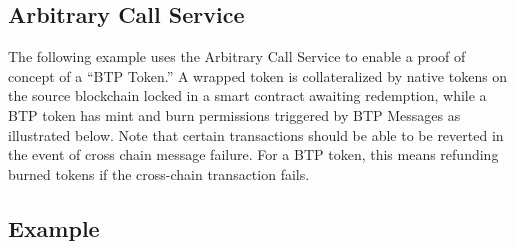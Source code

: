 \documentclass{article}
\begin{document}
\subsection{Arbitrary Call Service}
The following example uses the Arbitrary Call Service to enable a proof of concept of a “BTP Token.” A wrapped token is collateralized by native tokens on the source blockchain locked in a smart contract awaiting redemption, while a BTP token has mint and burn permissions triggered by BTP Messages as illustrated below. Note that certain transactions should be able to be reverted in the event of cross chain message failure. For a BTP token, this means refunding burned tokens if the cross-chain transaction fails.

\subsection{Example}
\end{document}
